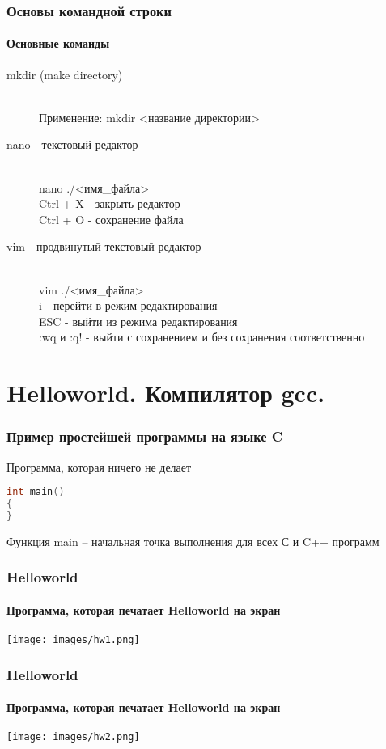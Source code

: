 \documentclass[12pt,pdf,hyperref={unicode}]{beamer}
\begin{document}
\begin{frame}
\frametitle{Основы командной строки} 
\framesubtitle{Основные команды}
\begin{description}
  \item[mkdir (make directory)] \hfill \\
  Применение: mkdir <название директории>
  \item[nano - текстовый редактор] \hfill \\
  nano ./<имя\_файла>\\
  Ctrl + X - закрыть редактор\\
  Ctrl + O - сохранение файла
  \item[vim - продвинутый текстовый редактор] \hfill \\
  vim ./<имя\_файла>\\
  i - перейти в режим редактирования\\
  ESC - выйти из режима редактирования\\
  :wq и :q! - выйти с сохранением и без сохранения соответственно
\end{description}
\end{frame}


\section{Helloworld. Компилятор gcc.}


\begin{frame}[fragile]
\frametitle{Пример простейшей программы на языке C}
Программа, которая ничего не делает \\
\begin{lstlisting}[language=C++,basicstyle=\ttfamily,keywordstyle=\color{blue}]
int main()
{
}
\end{lstlisting}
Функция main -- начальная точка выполнения для всех С и C++ программ
\end{frame}

\begin{frame}[fragile]
\frametitle{Helloworld} 
\framesubtitle{Программа, которая печатает Helloworld на экран} 
\begin{center}
\texttt{[image: images/hw1.png]}
\end{center}
\end{frame}

\begin{frame}[fragile]
\frametitle{Helloworld} 
\framesubtitle{Программа, которая печатает Helloworld на экран} 
\begin{center}
\texttt{[image: images/hw2.png]}
\end{center}
\end{frame}
\end{document}
